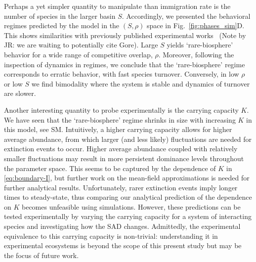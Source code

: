 \documentclass[9pt,twocolumn,twoside,lineno]{pnas-new}
\begin{document}
Perhaps a yet simpler quantity to manipulate than immigration rate is the number of species in the larger basin $S$.
Accordingly, we presented the behavioral regimes predicted by the model in the $(S,\rho)$ space in Fig.~\ref{fig:phases_sim}D.
This shows similarities with previously published experimental works~\cite{} (Note by JR: we are waiting to potentially cite Gore). %
Large $S$ yields `rare-biosphere' behavior for a wide range of competitive overlap, $\rho$.
Moreover, following the inspection of dynamics in regimes, we conclude that the `rare-biosphere' regime corresponds to erratic behavior, with fast species turnover.
Conversely, in low $\rho$ or low $S$ we find bimodality where the system is stable and dynamics of turnover are slower.

Another interesting quantity to probe experimentally is the carrying capacity $K$.
We have seen that the `rare-biosphere' regime shrinks in size with increasing $K$ in this model, see SM.
Intuitively, a higher carrying capacity allows for higher average abundance, from which larger (and less likely) fluctuations are needed for extinction events to occur.
Higher average abundance coupled with relatively smaller fluctuations may result in more persistent dominance levels throughout the parameter space.
This seems to be captured by the dependence of $K$ in \eqref{eq:boundary-I}, but further work on the mean-field approximations is needed %
for further analytical results.
Unfortunately, rarer extinction events imply longer times to steady-state, thus comparing our analytical prediction of the dependence on $K$ becomes unfeasible using simulations.
However, these predictions can be tested experimentally by varying the carrying capacity for a system of interacting species and investigating how the SAD changes.
Admittedly, the experimental equivalence to this carrying capacity is %
non-trivial: understanding it in experimental ecosystems is beyond the scope of this present study but may be the focus of future work. %
\end{document}
